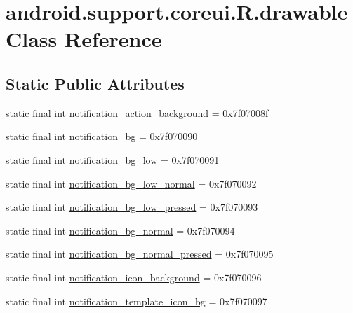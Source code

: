 \hypertarget{classandroid_1_1support_1_1coreui_1_1R_1_1drawable}{}\section{android.\+support.\+coreui.\+R.\+drawable Class Reference}
\label{classandroid_1_1support_1_1coreui_1_1R_1_1drawable}
\subsection*{Static Public Attributes}
\begin{DoxyCompactItemize}
\item 
static final int \mbox{\hyperlink{classandroid_1_1support_1_1coreui_1_1R_1_1drawable_a82491dac97c48bc1455f0385a70b2ddf}{notification\+\_\+action\+\_\+background}} = 0x7f07008f
\item 
static final int \mbox{\hyperlink{classandroid_1_1support_1_1coreui_1_1R_1_1drawable_a1c8146145db024a50e235921fc2cc2da}{notification\+\_\+bg}} = 0x7f070090
\item 
static final int \mbox{\hyperlink{classandroid_1_1support_1_1coreui_1_1R_1_1drawable_a95fb51d823631a171628dbd2f001a6bf}{notification\+\_\+bg\+\_\+low}} = 0x7f070091
\item 
static final int \mbox{\hyperlink{classandroid_1_1support_1_1coreui_1_1R_1_1drawable_afe30750d9bfc3bfd5420ea52b84dfb4e}{notification\+\_\+bg\+\_\+low\+\_\+normal}} = 0x7f070092
\item 
static final int \mbox{\hyperlink{classandroid_1_1support_1_1coreui_1_1R_1_1drawable_a5e3dd2843d22fa341656b1fe71764f0d}{notification\+\_\+bg\+\_\+low\+\_\+pressed}} = 0x7f070093
\item 
static final int \mbox{\hyperlink{classandroid_1_1support_1_1coreui_1_1R_1_1drawable_abcb37071db3c22f947558bb671447744}{notification\+\_\+bg\+\_\+normal}} = 0x7f070094
\item 
static final int \mbox{\hyperlink{classandroid_1_1support_1_1coreui_1_1R_1_1drawable_ae6e843ccd22ef31f6234459f7a677a66}{notification\+\_\+bg\+\_\+normal\+\_\+pressed}} = 0x7f070095
\item 
static final int \mbox{\hyperlink{classandroid_1_1support_1_1coreui_1_1R_1_1drawable_ab86830b1048554d986d5aa69cd4630f4}{notification\+\_\+icon\+\_\+background}} = 0x7f070096
\item 
static final int \mbox{\hyperlink{classandroid_1_1support_1_1coreui_1_1R_1_1drawable_a07e55740f0809357a6cca5a6f96f383b}{notification\+\_\+template\+\_\+icon\+\_\+bg}} = 0x7f070097

\end{DoxyCompactItemize}
